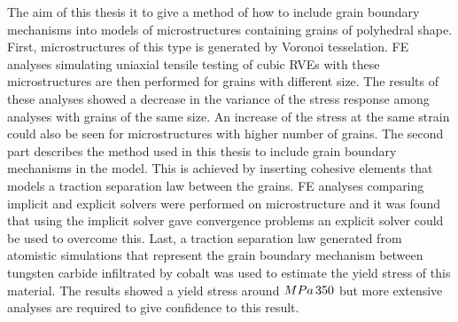 \documentclass[abstract.tex]{subfiles}
\begin{document}
The aim of this thesis it to give a method of how to include grain boundary mechanisms into models of microstructures containing grains of polyhedral shape.
First, microstructures of this type is generated by Voronoi tesselation. FE analyses simulating uniaxial tensile testing of cubic RVEs with these microstructures are then performed for grains with different size. The results of these analyses showed a decrease in the variance of the stress response among analyses with grains of the same size. An increase of the stress at the same strain could also be seen for microstructures with higher number of grains.  The second part describes the method used in this thesis to include grain boundary mechanisms in the model. This is achieved by inserting cohesive elements that models a traction separation law between the grains. FE analyses comparing implicit and explicit solvers were performed on microstructure and it was found that using the implicit solver gave convergence problems an explicit solver could be used to overcome this. Last, a traction separation law generated from atomistic simulations that represent the grain boundary mechanism between tungsten carbide infiltrated by cobalt was used to estimate the yield stress of this material. The results showed a yield stress around $\unit[MPa]{350}$ but more extensive analyses are required to give confidence to this result.
\end{document}
